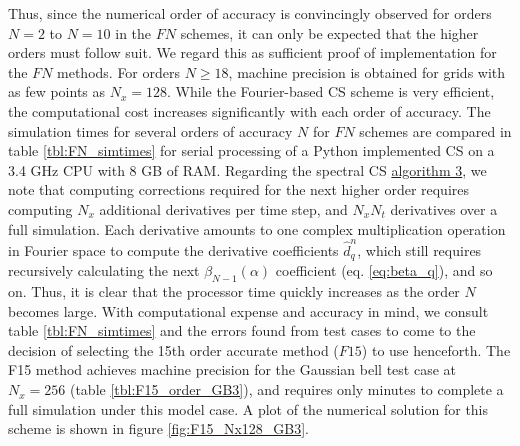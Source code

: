 \documentclass[11pt,titlepage]{report}
\begin{document}
\noindent Thus, since the numerical order of accuracy is convincingly observed for orders $N = 2$ to $N = 10$ in the $FN$ schemes, it can only be expected that the higher orders must follow suit. We regard this as sufficient proof of implementation for the $FN$ methods. For orders $N \geq 18$, machine precision is obtained for grids with as few points as $N_x = 128$. While the Fourier-based CS scheme is very efficient, the computational cost increases significantly with each order of accuracy. The simulation times for several orders of accuracy $N$ for $FN$ schemes are compared in table \ref{tbl:FN_simtimes} for serial processing of a Python implemented CS on a 3.4 GHz CPU with 8 GB of RAM.  Regarding the spectral CS \hyperlink{alg:3}{algorithm 3}, we note that computing corrections required for the next higher order requires computing $N_x$ additional derivatives per time step, and $N_xN_t$ derivatives over a full simulation. Each derivative amounts to one complex multiplication operation in Fourier space to compute the derivative coefficients $\hat{d}_q^n$, which still requires recursively calculating the next $\beta_{N-1}(\alpha )$ coefficient (eq. \eqref{eq:beta_q}), and so on. Thus, it is clear that the processor time quickly increases as the order $N$ becomes large. With computational expense and accuracy in mind, we consult table \ref{tbl:FN_simtimes} and the errors found from test cases to come to the decision of selecting the 15th order accurate method ($F15$) to use henceforth. The F15 method achieves machine precision for the Gaussian bell test case at $N_x = 256$ (table \ref{tbl:F15_order_GB3}), and requires only minutes to complete a full simulation under this model case. A plot of the numerical solution for this scheme is shown in figure \ref{fig:F15_Nx128_GB3}.
\end{document}
